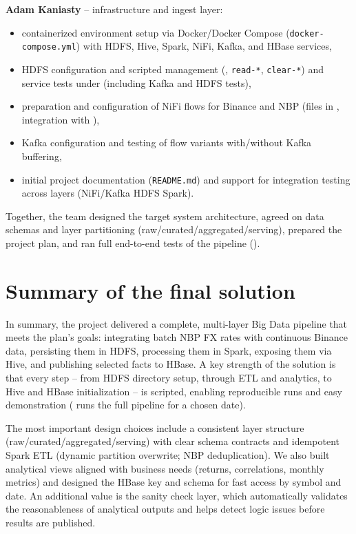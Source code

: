 \documentclass{article}
\begin{document}
\textbf{Adam Kaniasty} -- infrastructure and ingest layer:
\begin{itemize}
\item
  containerized environment setup via Docker/Docker Compose
  (\texttt{docker-compose.yml}) with HDFS, Hive, Spark, NiFi, Kafka, and
  HBase services,
\item
  HDFS configuration and scripted management
  (, \texttt{read-*}, \texttt{clear-*})
  and service tests under  (including Kafka and HDFS
  tests),
\item
  preparation and configuration of NiFi flows for Binance and NBP
  (files in , integration with
  ),
\item
  Kafka configuration and testing of flow variants with/without Kafka
  buffering,
\item
  initial project documentation (\texttt{README.md}) and support for
  integration testing across layers (NiFi/Kafka \textrightarrow{} HDFS
  \textrightarrow{} Spark).
\end{itemize}

Together, the team designed the target system architecture, agreed on
data schemas and layer partitioning (raw/curated/aggregated/serving),
prepared the project plan, and ran full end-to-end tests of the
pipeline ().

\section{Summary of the final solution}

In summary, the project delivered a complete, multi-layer Big Data
pipeline that meets the plan's goals: integrating batch NBP FX rates with
continuous Binance data, persisting them in HDFS, processing them in
Spark, exposing them via Hive, and publishing selected facts to HBase.
A key strength of the solution is that every step -- from HDFS directory
setup, through ETL and analytics, to Hive and HBase initialization -- is
scripted, enabling reproducible runs and easy demonstration
( runs the full pipeline for a
chosen date).

The most important design choices include a consistent layer structure
(raw/curated/aggregated/serving) with clear schema contracts and
idempotent Spark ETL (dynamic partition overwrite; NBP deduplication).
We also built analytical views aligned with business needs (returns,
correlations, monthly metrics) and designed the HBase key and schema for
fast access by symbol and date. An additional value is the sanity check
layer, which automatically validates the reasonableness of analytical
outputs and helps detect logic issues before results are published.
\end{document}
